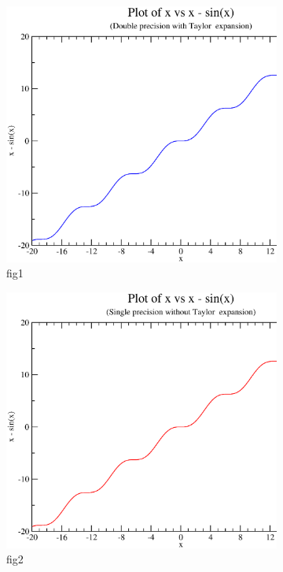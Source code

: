 \documentclass{article}
\begin{document}
\begin{figure}[ht!]
  \begin{subfigure}[b]{0.5\linewidth}
    \centering
    \includegraphics[width=0.75\linewidth]{images/a.eps}
    \caption{fig1}
    \label{fig7:a}
    \vspace{4ex}
  \end{subfigure}%
  \begin{subfigure}[b]{0.5\linewidth}
    \centering
    \includegraphics[width=0.75\linewidth]{images/b.eps}
    \caption{fig2}
    \label{fig7:b}
    \vspace{4ex}
  \end{subfigure}
  \begin{subfigure}[b]{0.5\linewidth}
    \centering

\end{subfigure}
\end{figure}
\end{document}
